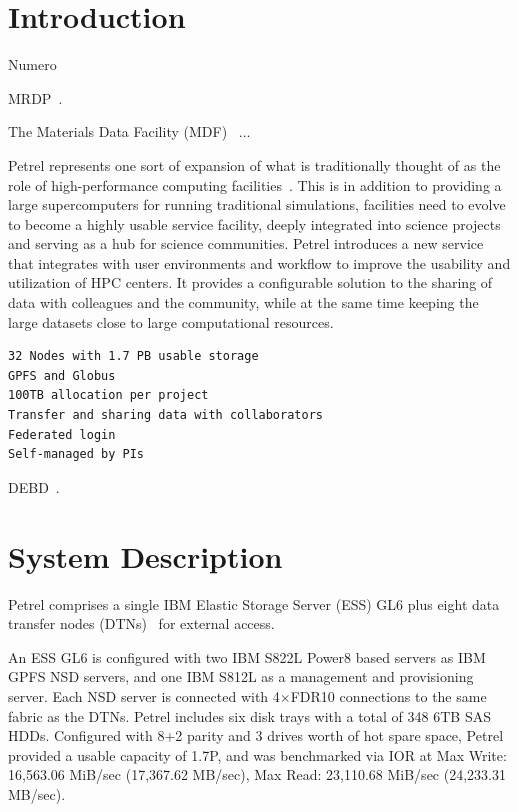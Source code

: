 \documentclass[sigconf]{acmart}
\begin{document}




\maketitle

\section{Introduction}

Numero

MRDP~\cite{BMRDP}.

The Materials Data Facility (MDF)~\cite{MDF2016} ...

Petrel represents one sort of expansion of what is traditionally thought of as the role of high-performance computing facilities~\cite{UrPa16}. 
This is in addition to providing a large supercomputers for running traditional simulations, facilities need to evolve to become a highly usable service facility, deeply integrated into science projects and serving as a hub for science communities. 
Petrel introduces a new service that integrates with user environments and workflow to improve the usability and utilization of HPC centers. 
It provides a configurable solution to the sharing of data with colleagues and the community, 
while at the  same time keeping the large datasets close to large computational resources.

\begin{verbatim}
32 Nodes with 1.7 PB usable storage
GPFS and Globus
100TB allocation per project
Transfer and sharing data with collaborators
Federated login
Self-managed by PIs
\end{verbatim}

DEBD~\cite{foster2015networking}.


\section{System Description}

Petrel comprises a single IBM Elastic Storage Server (ESS) GL6 plus eight data transfer nodes (DTNs)~\cite{dart2014science} for external access.

An ESS GL6 is configured with two IBM S822L Power8 based servers as IBM GPFS NSD servers, and one IBM S812L as a management and provisioning server. 
Each NSD server is connected with 4$\times$FDR10 connections to the same fabric as the DTNs. 
Petrel includes six disk trays with a total of 348 6TB SAS HDDs. 
Configured with 8+2 parity and 3 drives worth of hot spare space, Petrel provided a usable capacity of 1.7P, and was benchmarked via IOR at Max Write: 16,563.06 MiB/sec (17,367.62 MB/sec), Max Read:  23,110.68 MiB/sec (24,233.31 MB/sec).
\end{document}
